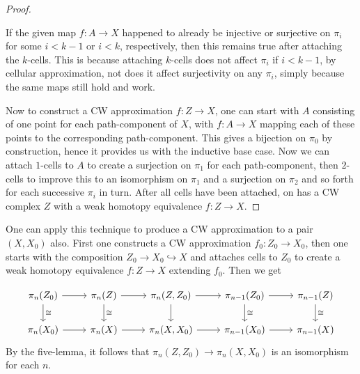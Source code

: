 \begin{proof}
     \begin{note}
         If the given map $f \colon A \to X$ happened
         to already be injective or surjective
         on $\pi_i$ for some $i < k-1$ or
         $i < k$, respectively, then this remains
         true after attaching the $k$-cells.
         This is because attaching $k$-cells does
         not affect $\pi_i$ if $i < k-1$, by
         cellular approximation, not does
         it affect surjectivity on
         any $\pi_i$, simply because the same maps
         still hold and work.
     \end{note}

     Now to construct a CW approximation $f \colon Z \to 
     X$, one can start with $A$ consisting of one point for
     each path-component of $X$, with
     $f \colon A \to X$ mapping each of these points
     to the corresponding path-component.
     This gives a bijection on $\pi_0$ by construction, hence
     it provides us with the inductive base case.
     Now we can attach $1$-cells to $A$ to create
     a surjection on $\pi_1$ for each path-component, then
     $2$-cells to improve this to an isomorphism on
     $\pi_1$ and a surjection on $\pi_2$ and so forth
     for each successive $\pi_i$ in turn. After all cells
     have been attached, on has a CW complex $Z$ with
     a weak homotopy equivalence $f \colon Z \to X$.
\end{proof}


\begin{example}[]
    One can apply this technique to produce a CW approximation
    to a pair $(X,X_0)$ also. First one constructs
    a CW approximation $f_0 \colon Z_0 \to X_0$, then
    one starts with the composition
    $Z_0 \to X_0 \hookrightarrow X$ and attaches
    cells to $Z_0$ to create a weak homotopy equivalence
    $f \colon Z \to X$ extending $f_0$.
    Then we get

    \begin{equation*}
    \begin{tikzcd}
        \pi_n(Z_0) \ar[r] \ar[d, "\cong"] & \pi_n (Z) \ar[r] \ar[d,
        "\cong"] & 
        \pi_n (Z, Z_0) \ar[r] \ar[d] &
        \pi_{n-1} (Z_0) \ar[r] 
        \ar[d, "\cong"]&
        \pi_{n-1} (Z) \ar[d, "\cong"] \\
        \pi_n (X_0) \ar[r] & \pi_n(X) \ar[r] & \pi_n (X,X_0) \ar[r] &
        \pi_{n-1} (X_0) \ar[r] & \pi_{n-1}(X)
    \end{tikzcd}
    \end{equation*}
    By the five-lemma, it follows that
    $\pi_n \left( Z,Z_0 \right) \to 
    \pi_n \left( X,X_0 \right) $ is an isomorphism
    for each $n$.
\end{example}

